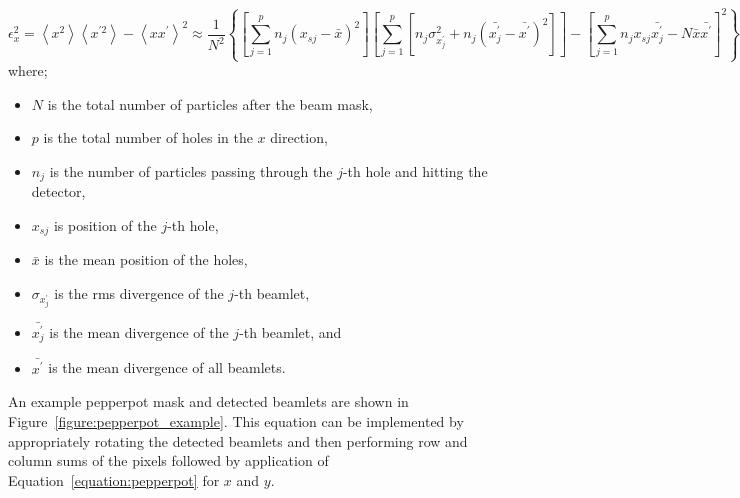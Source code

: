\begin{dmath}\label{equation:pepperpot}
\epsilon_x^2 = \left\langle x^2\right\rangle \left\langle x^{\prime2}\right\rangle - \left\langle xx^\prime\right\rangle^2\allowbreak
\approx \frac{1}{N^2} \left\{\left[\sum_{j=1}^p{n_j\left(x_{sj}-\bar{x}\right)^2}\right] \left[ \sum_{j=1}^p{\left[n_j\sigma_{x_j^\prime}^2 + n_j\left(\bar{x_j^\prime}-\bar{x^\prime}\right)^2\right]}\right] - \left[ \sum_{j=1}^p{n_jx_{sj}\bar{x_j^\prime}-N\bar{x}\bar{x^\prime}}\right]^2\right\}
\end{dmath}
where;
\begin{itemize}
    \item $N$ is the total number of particles after the beam mask,
    \item $p$ is the total number of holes in the $x$ direction,
    \item $n_j$ is the number of particles passing through the $j$-th hole and hitting the detector,
    \item $x_{sj}$ is position of the $j$-th hole,
    \item $\bar{x}$ is the mean position of the holes,
    \item $\sigma_{x_j^\prime}$ is the \gls{rms} divergence of the $j$-th beamlet,
    \item $\bar{x_j^\prime}$ is the mean divergence of the $j$-th beamlet, and
    \item $\bar{x^\prime}$ is the mean divergence of all beamlets.
\end{itemize}

An example pepperpot mask and detected beamlets are shown in Figure~\ref{figure:pepperpot_example}.
This equation can be implemented by appropriately rotating the detected beamlets and then performing row and column sums of the pixels followed by application of Equation~\ref{equation:pepperpot} for $x$ and $y$.

